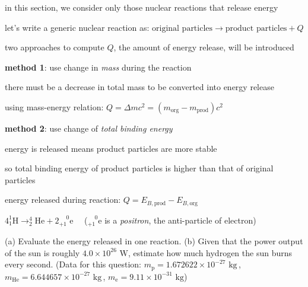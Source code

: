 in this section, we consider only those nuclear reactions that release energy

let's write a generic nuclear reaction as: $\text{original particles} \longrightarrow \text{product particles} + Q$

two approaches to compute $Q$, the amount of energy release, will be introduced

\noindent \textbf{method 1}: use change in \emph{mass} during the reaction

there must be a decrease in total mass to be converted into energy release

using mass-energy relation: $Q=\Delta mc^2 = (m_\text{org} - m_\text{prod})c^2$

\noindent \textbf{method 2}: use change of \emph{total binding energy}

energy is released means product particles are more stable

so total binding energy of product particles is higher than that of original particles

energy released during reaction: $Q= E_{B,\text{prod}} - E_{B,\text{org}}$


{

\centering

$4 ^1_1\text{H} \longrightarrow ^4_2\text{He} + 2 ^{\phantom{+}0}_{+1}\text{e} \quad$ ($^{\phantom{+}0}_{+1}\text{e}$ is a \emph{positron}, the anti-particle of electron)

}

\noindent (a) Evaluate the energy released in one reaction. (b) Given that the power output of the sun is roughly $4.0\times10^{26}\text{ W}$, estimate how much hydrogen the sun burns every second. (Data for this question: $m_\text{p}=1.672622\times10^{-27}\text{ kg} \,$, $m_\text{He}=6.644657\times10^{-27}\text{ kg} \,$,  $m_\text{e}=9.11\times10^{-31}\text{ kg}$)


